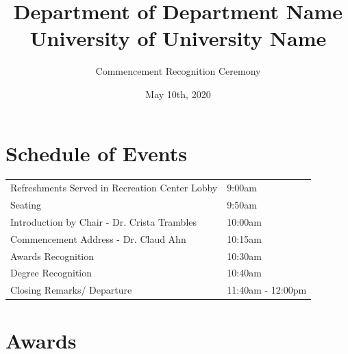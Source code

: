 \documentclass{book} %
\title{\Huge{Department of Department Name \\ University of University Name}}
\author{\LARGE{Commencement Recognition Ceremony}}
\date{\LARGE{May 10th, 2020}}
\begin{document}
\maketitle

\section*{Schedule of Events} %
  \begin{table}[htp]
    \begin{tabular}{l|l}
Refreshments Served in Recreation Center Lobby & 9:00am\\
Seating & 9:50am\\
Introduction by Chair - Dr. Crista Trambles & 10:00am\\
Commencement Address - Dr. Claud Ahn & 10:15am\\
Awards Recognition & 10:30am\\
Degree Recognition & 10:40am\\
Closing Remarks/ Departure & 11:40am - 12:00pm

  \end{tabular}
  \end{table}
\section*{Awards} %
\end{document}
